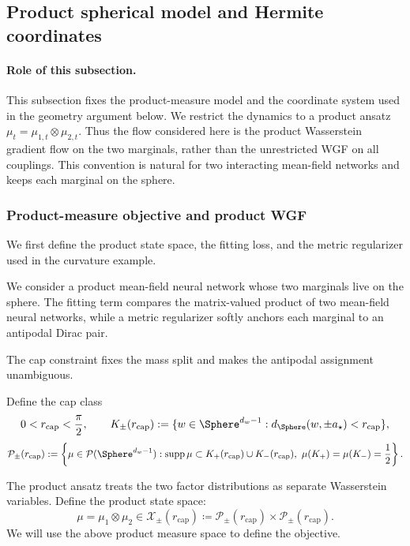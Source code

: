 
\subsection{Product spherical model and Hermite coordinates}
\label{subsec:product-spherical-model}

\paragraph{Role of this subsection.}
This subsection fixes the product-measure model and the coordinate system used in the geometry argument below. We restrict the dynamics to a product ansatz
\(\mu_t=\mu_{1,t}\otimes\mu_{2,t}\). Thus the flow considered here is the product Wasserstein gradient flow on the two marginals, rather than the unrestricted WGF on all couplings. This convention is natural for two interacting mean-field networks and keeps each marginal on the sphere.

\subsubsection{Product-measure objective and product WGF}

We first define the product state space, the fitting loss, and the metric
regularizer used in the curvature example.

We consider a product mean-field neural network whose two marginals live on the sphere. The fitting term compares the matrix-valued product of two mean-field neural networks, while a metric regularizer softly anchors each marginal to an antipodal Dirac pair.

The cap constraint fixes the mass split and makes the antipodal assignment unambiguous.

Define the cap class
\begin{equation}
\label{eq:mf-spherical-caps}
0<r_{\mathrm{cap}}<\frac\pi2,
\qquad
K_\pm(r_{\mathrm{cap}})
:=
\{w\in\Sphere^{d_w-1}: d_\Sphere(w,\pm a_\star)<r_{\mathrm{cap}}\},
\end{equation}
\begin{equation}
\label{eq:mf-cap-class}
\mathcal P_\pm(r_{\mathrm{cap}})
:=
\left\{
\mu\in\mathcal P(\Sphere^{d_w-1}):
\operatorname{supp}\mu\subset K_+(r_{\mathrm{cap}})\cup K_-(r_{\mathrm{cap}}),
\ \mu(K_+)=\mu(K_-)=\frac12
\right\}.
\end{equation}

The product ansatz treats the two factor distributions as separate Wasserstein
variables. Define the product state space:
\begin{equation}
\label{eq:mf-product-cap-class}
   \mu=\mu_1\otimes\mu_2\in  \mathcal X_\pm(r_{\mathrm{cap}})
\coloneq 
\mathcal P_\pm(r_{\mathrm{cap}})\times\mathcal P_\pm(r_{\mathrm{cap}}).
\end{equation}
We will use the above product measure space to define the objective.

